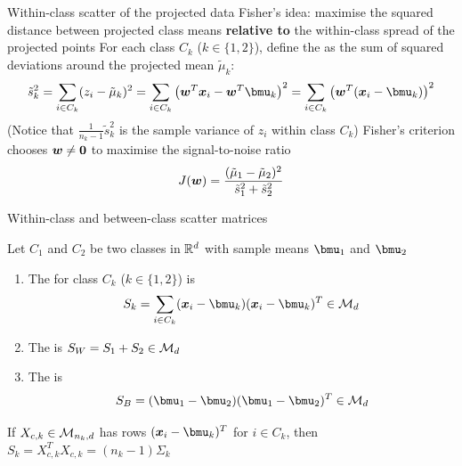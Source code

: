 \documentclass[aspectratio=169]{beamer}\usepackage[]{graphicx}\usepackage[]{xcolor}
\begin{document}
\begin{frame}{Within-class scatter of the projected data}
    Fisher's idea: maximise the squared distance between projected class means \textbf{relative to} the within-class spread of the projected points
    \vfill
    For each class $C_k$ ($k \in \{1, 2\}$), define the  as the sum of squared deviations around the projected mean $\tilde{\mu}_k$:
    \[
        \tilde{s}_k^2 = \sum_{i \in C_k} (z_i - \tilde{\mu}_k)^2 = \sum_{i \in C_k} \left(\bw^T \bx_i - \bw^T \bmu_k\right)^2 = \sum_{i \in C_k} \left(\bw^T(\bx_i - \bmu_k)\right)^2
    \]
    (Notice that $\frac{1}{n_k - 1}\tilde{s}_k^2$ is the sample variance of $z_i$ within class $C_k$)
    \vfill
    Fisher's criterion chooses $\bw \neq \b0$ to maximise the signal-to-noise ratio
    \[
        J(\bm{w}) = \frac{(\tilde{\mu}_1 - \tilde{\mu}_2)^2}{\tilde{s}_1^2 + \tilde{s}_2^2}
    \]
\end{frame}


\begin{frame}{Within-class and between-class scatter matrices}
    \begin{importantdefinition}
        Let $C_1$ and $C_2$ be two classes in $\mathbb{R}^d$ with sample means $\bmu_1$ and $\bmu_2$
        \begin{enumerate}
            \item The  for class $C_k$ ($k \in \{1, 2\}$) is
            \[
                S_k = \sum_{i \in C_k} (\bx_i - \bmu_k)(\bx_i - \bmu_k)^T \in \M_d
            \]
            \item The  is $S_W = S_1 + S_2 \in \mathcal{M}_d$
            \item The  is
            \[
                S_B = (\bmu_1 - \bmu_2)(\bmu_1 - \bmu_2)^T \in \M_d
            \]
        \end{enumerate}
    \end{importantdefinition}
    \vfill
    If $X_{c, k} \in \mathcal{M}_{n_k, d}$ has rows $(\bx_i - \bmu_k)^T$ for $i \in C_k$, then $S_k = X_{c, k}^T X_{c, k} = (n_k - 1)\Sigma_k$
\end{frame}
\end{document}
